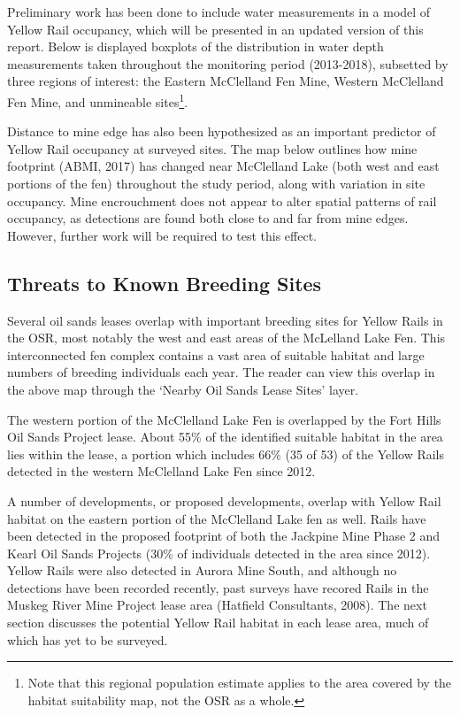 \documentclass[11pt,]{article}
\begin{document}
Preliminary work has been done to include water measurements in a model
of Yellow Rail occupancy, which will be presented in an updated version
of this report. Below is displayed boxplots of the distribution in water
depth measurements taken throughout the monitoring period (2013-2018),
subsetted by three regions of interest: the Eastern McClelland Fen Mine,
Western McClelland Fen Mine, and unmineable sites\footnote{Note that
  this regional population estimate applies to the area covered by the
  habitat suitability map, not the OSR as a whole.}.

Distance to mine edge has also been hypothesized as an important
predictor of Yellow Rail occupancy at surveyed sites. The map below
outlines how mine footprint (ABMI, 2017) has changed near McClelland
Lake (both west and east portions of the fen) throughout the study
period, along with variation in site occupancy. Mine encrouchment does
not appear to alter spatial patterns of rail occupancy, as detections
are found both close to and far from mine edges. However, further work
will be required to test this effect.

\subsection{Threats to Known Breeding
Sites}\label{threats-to-known-breeding-sites}

Several oil sands leases overlap with important breeding sites for
Yellow Rails in the OSR, most notably the west and east areas of the
McLelland Lake Fen. This interconnected fen complex contains a vast area
of suitable habitat and large numbers of breeding individuals each year.
The reader can view this overlap in the above map through the `Nearby
Oil Sands Lease Sites' layer.

The western portion of the McClelland Lake Fen is overlapped by the Fort
Hills Oil Sands Project lease. About 55\% of the identified suitable
habitat in the area lies within the lease, a portion which includes 66\%
(35 of 53) of the Yellow Rails detected in the western McClelland Lake
Fen since 2012.

A number of developments, or proposed developments, overlap with Yellow
Rail habitat on the eastern portion of the McClelland Lake fen as well.
Rails have been detected in the proposed footprint of both the Jackpine
Mine Phase 2 and Kearl Oil Sands Projects (30\% of individuals detected
in the area since 2012). Yellow Rails were also detected in Aurora Mine
South, and although no detections have been recorded recently, past
surveys have recored Rails in the Muskeg River Mine Project lease area
(Hatfield Consultants, 2008). The next section discusses the potential
Yellow Rail habitat in each lease area, much of which has yet to be
surveyed.
\end{document}
